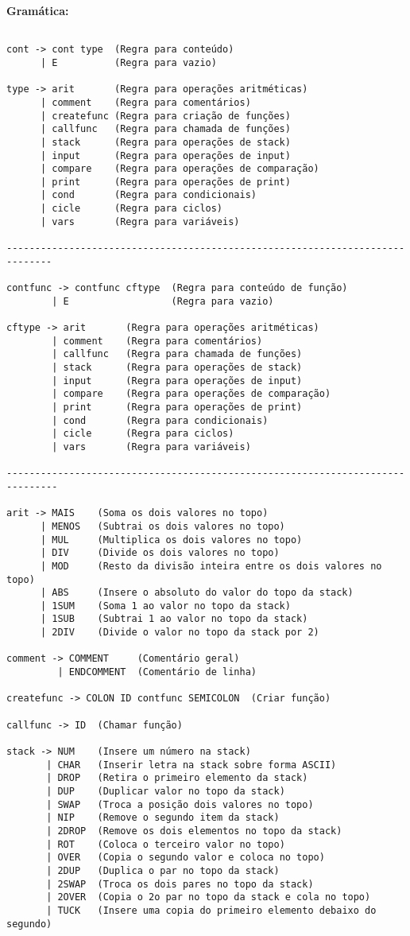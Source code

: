 \documentclass{article}
\begin{document}
\textbf{Gramática:}
\begin{verbatim}

cont -> cont type  (Regra para conteúdo)
      | E          (Regra para vazio)

type -> arit       (Regra para operações aritméticas)
      | comment    (Regra para comentários)
      | createfunc (Regra para criação de funções)
      | callfunc   (Regra para chamada de funções)
      | stack      (Regra para operações de stack)
      | input      (Regra para operações de input)
      | compare    (Regra para operações de comparação)
      | print      (Regra para operações de print)
      | cond       (Regra para condicionais)
      | cicle      (Regra para ciclos)
      | vars       (Regra para variáveis)

------------------------------------------------------------------------------   

contfunc -> contfunc cftype  (Regra para conteúdo de função)
        | E                  (Regra para vazio)

cftype -> arit       (Regra para operações aritméticas)
        | comment    (Regra para comentários)
        | callfunc   (Regra para chamada de funções)
        | stack      (Regra para operações de stack)
        | input      (Regra para operações de input)
        | compare    (Regra para operações de comparação)
        | print      (Regra para operações de print)
        | cond       (Regra para condicionais)
        | cicle      (Regra para ciclos)
        | vars       (Regra para variáveis)

-------------------------------------------------------------------------------

arit -> MAIS    (Soma os dois valores no topo) 
      | MENOS   (Subtrai os dois valores no topo)
      | MUL     (Multiplica os dois valores no topo) 
      | DIV     (Divide os dois valores no topo)
      | MOD     (Resto da divisão inteira entre os dois valores no topo)
      | ABS     (Insere o absoluto do valor do topo da stack)
      | 1SUM    (Soma 1 ao valor no topo da stack)
      | 1SUB    (Subtrai 1 ao valor no topo da stack)
      | 2DIV    (Divide o valor no topo da stack por 2)

comment -> COMMENT     (Comentário geral)
         | ENDCOMMENT  (Comentário de linha)

createfunc -> COLON ID contfunc SEMICOLON  (Criar função)

callfunc -> ID  (Chamar função)

stack -> NUM    (Insere um número na stack) 
       | CHAR   (Inserir letra na stack sobre forma ASCII) 
       | DROP   (Retira o primeiro elemento da stack)
       | DUP    (Duplicar valor no topo da stack)
       | SWAP   (Troca a posição dois valores no topo) 
       | NIP    (Remove o segundo item da stack)
       | 2DROP  (Remove os dois elementos no topo da stack)
       | ROT    (Coloca o terceiro valor no topo)
       | OVER   (Copia o segundo valor e coloca no topo)
       | 2DUP   (Duplica o par no topo da stack) 
       | 2SWAP  (Troca os dois pares no topo da stack) 
       | 2OVER  (Copia o 2o par no topo da stack e cola no topo)
       | TUCK   (Insere uma copia do primeiro elemento debaixo do segundo)


\end{verbatim}
\end{document}
